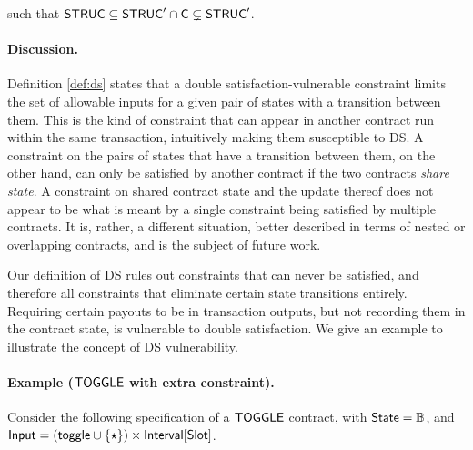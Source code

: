 such that $\mathsf{STRUC} \subseteq \mathsf{STRUC}' \cap \mathsf{C} \subsetneq \mathsf{STRUC}'$.

\paragraph{Discussion. }
Definition \ref{def:ds} states that a double satisfaction-vulnerable constraint
limits the set of allowable inputs for a given pair of states with a transition between them.
This is the kind of constraint that can appear in another contract run within the same
transaction, intuitively making them susceptible to DS. A constraint on the pairs of
states that have a transition between them, on the other hand, can only be satisfied by another
contract if the two contracts \emph{share state}. A constraint on shared contract
state and the update thereof does not appear to be what is meant by
a single constraint being satisfied by multiple contracts. It is, rather, a
different situation, better described in terms of nested or overlapping
contracts, and is the subject of future work.

Our definition of DS rules out constraints that can never be satisfied, and therefore all
constraints that eliminate
certain state transitions entirely. Requiring certain payouts
to be in transaction outputs, but not recording them in the contract state, is
vulnerable to double satisfaction. We give an example to illustrate
the concept of DS vulnerability.

\paragraph{Example ($\mathsf{TOGGLE}$ with extra constraint). }
\label{ex:toggle}
Consider the following specification of a $\mathsf{TOGGLE}$ contract, with $\mathsf{State} = \mathbb{B}$,
and $\textsf{Input} = (\mathsf{toggle} \cup \{\star\}) \times \textsf{Interval}[\textsf{Slot}]$.

